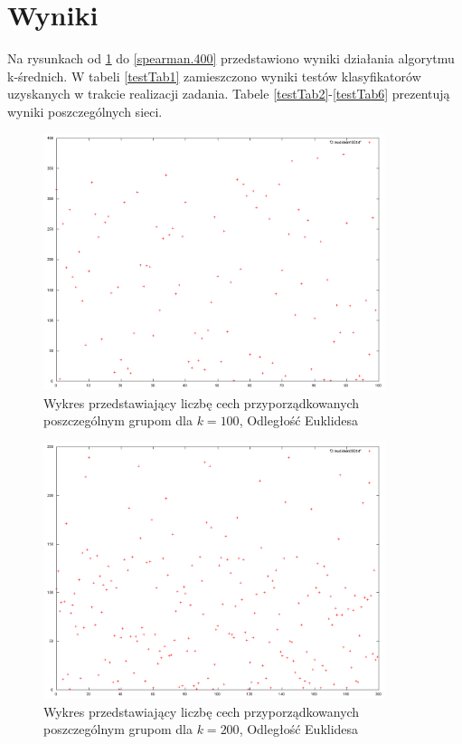 \documentclass{classrep}
\begin{document}
\section{Wyniki}
Na rysunkach od \ref{euclidean.100} do \ref{spearman.400} przedstawiono wyniki działania algorytmu k-średnich. W tabeli \ref{testTab1} zamieszczono wyniki testów klasyfikatorów uzyskanych w trakcie realizacji zadania. Tabele \ref{testTab2}-\ref{testTab6} prezentują wyniki poszczególnych sieci.
\begin{figure}
  \centering
  \includegraphics[width=10cm]{img/euclidean100.png}
  \caption{Wykres przedstawiający liczbę cech przyporządkowanych poszczególnym
grupom dla $k=100$, Odległość Euklidesa}
  \label{euclidean.100}
\end{figure}

\begin{figure}
  \centering
  \includegraphics[width=10cm]{img/euclidean200.png}
  \caption{Wykres przedstawiający liczbę cech przyporządkowanych poszczególnym
grupom dla $k=200$, Odległość Euklidesa}
  \label{euclidean.200}
\end{figure}
\end{document}
